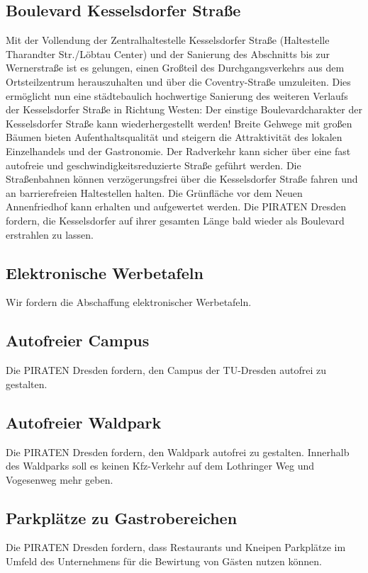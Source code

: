 \documentclass[a4paper, 11pt]{article}
\begin{document}
\subsection{Boulevard Kesselsdorfer Straße}
Mit der Vollendung der Zentralhaltestelle Kesselsdorfer Straße (Haltestelle Tharandter Str./Löbtau Center) und der Sanierung des Abschnitts bis zur Wernerstraße ist es gelungen, einen Großteil des Durchgangsverkehrs aus dem Ortsteilzentrum herauszuhalten und über die Coventry-Straße umzuleiten. Dies ermöglicht nun eine städtebaulich hochwertige Sanierung des weiteren Verlaufs der Kesselsdorfer Straße in Richtung Westen: Der einstige Boulevardcharakter der Kesselsdorfer Straße kann wiederhergestellt werden! Breite Gehwege mit großen Bäumen bieten Aufenthaltsqualität und steigern die Attraktivität des lokalen Einzelhandels und der Gastronomie. Der Radverkehr kann sicher über eine fast autofreie und geschwindigkeitsreduzierte Straße geführt werden. Die Straßenbahnen können verzögerungsfrei über die Kesselsdorfer Straße fahren und an barrierefreien Haltestellen halten. Die Grünfläche vor dem Neuen Annenfriedhof kann erhalten und aufgewertet werden. Die PIRATEN Dresden fordern, die Kesselsdorfer auf ihrer gesamten Länge bald wieder als Boulevard erstrahlen zu lassen.


\subsection{Elektronische Werbetafeln}
Wir fordern die Abschaffung elektronischer Werbetafeln.

\subsection{Autofreier Campus}
Die PIRATEN Dresden fordern, den Campus der TU-Dresden autofrei zu gestalten.


\subsection{Autofreier Waldpark}
Die PIRATEN Dresden fordern, den Waldpark autofrei zu gestalten. Innerhalb des Waldparks soll es keinen Kfz-Verkehr auf dem Lothringer Weg und Vogesenweg mehr geben.


\subsection{Parkplätze zu Gastrobereichen}
Die PIRATEN Dresden fordern, dass Restaurants und Kneipen Parkplätze im Umfeld des Unternehmens für die Bewirtung von Gästen nutzen können.
\end{document}
